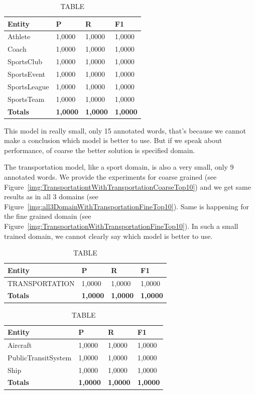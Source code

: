 \documentclass[thesis=M,english]{FITthesis}[2018/05/30]
\begin{document}
	\begin{table}[H]\centering
		\caption{TABLE}
		\label{}
		\begin{tabular}{|l|l|l|l|}
			\hline {\textbf{Entity}} & {\textbf{P}} & {\textbf{R}} & {\textbf{F1}}\\\hline
				Athlete & 1,0000 & 1,0000 & 1,0000\\
				Coach & 1,0000 & 1,0000 & 1,0000\\
				SportsClub & 1,0000 & 1,0000 & 1,0000\\
				SportsEvent & 1,0000 & 1,0000 & 1,0000\\
				SportsLeague & 1,0000 & 1,0000 & 1,0000\\
				SportsTeam & 1,0000 & 1,0000 & 1,0000\\\hline
				\textbf{Totals} & \textbf{1,0000} & \textbf{1,0000} & \textbf{1,0000}\\\hline
		\end{tabular}
	\end{table}	

	This model in really small, only 15 annotated words, that's because we cannot make a conclusion which model is better to use. But if we speak about performance, of coarse the better solution is specified domain.	
	
	The transportation model, like a sport domain, is also a very small, only 9 annotated words. We provide the experiments for coarse grained (see Figure~\ref{img:TransportationtWithTransportationCoarseTop10}) and we get same results as in all 3 domains (see Figure~\ref{img:all3DomainWithTransportationFineTop10}). Same is happening for the fine grained domain (see Figure~\ref{img:TransportationWithTransportationFineTop10}). In such a small trained domain, we cannot clearly say which model is better to use.
	\begin{table}[H]\centering
		\caption{TABLE}
		\label{}
		\begin{tabular}{|l|l|l|l|}
			\hline {\textbf{Entity}} & {\textbf{P}} & {\textbf{R}} & {\textbf{F1}}\\\hline
				TRANSPORTATION & 1,0000 & 1,0000 & 1,0000\\\hline
				\textbf{Totals} & \textbf{1,0000} & \textbf{1,0000} & \textbf{1,0000}\\\hline
		\end{tabular}
	\end{table}

	\begin{table}[H]\centering
		\caption{TABLE}
		\label{}
		\begin{tabular}{|l|l|l|l|}
			\hline {\textbf{Entity}} & {\textbf{P}} & {\textbf{R}} & {\textbf{F1}}\\\hline
				Aircraft & 1,0000 & 1,0000 & 1,0000\\
				PublicTransitSystem & 1,0000 & 1,0000 & 1,0000\\
				Ship & 1,0000 & 1,0000 & 1,0000\\\hline
				\textbf{Totals} & \textbf{1,0000} & \textbf{1,0000} & \textbf{1,0000}\\\hline
		\end{tabular}
	\end{table}
	
\end{document}
